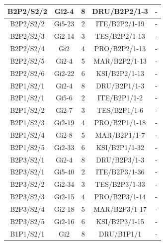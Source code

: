 \documentclass[a4paper,12pt]{extarticle}  %
\begin{document}
\begin{longtable}[c]{|c|c|c|c|c|}
	B2P2/S2/2 & Gi2-4   & 8 & DRU/B2P2/1-3  & -           \\ \hline %
	B2P2/S2/2 & Gi5-23  & 2 & ITE/B2P2/1-19 & -           \\ \hline %
	B2P2/S2/3 & Gi2-14  & 3 & TES/B2P2/1-13 & -           \\ \hline %
	B2P2/S2/4 & Gi2     & 4 & PRO/B2P2/1-13 & -           \\ \hline %
	B2P2/S2/5 & Gi2-4   & 5 & MAR/B2P2/1-13 & -           \\ \hline %
	B2P2/S2/6 & Gi2-22  & 6 & KSI/B2P2/1-13 & -           \\ \hline %
	B2P1/S2/1 & Gi2-4   & 8 & DRU/B2P1/1-3  & -           \\ \hline %
	B2P1/S2/1 & Gi5-6   & 2 & ITE/B2P1/1-2  & -           \\ \hline %
	B2P1/S2/2 & Gi2-7   & 3 & TES/B2P1/1-6  & -           \\ \hline %
	B2P1/S2/3 & Gi2-19  & 4 & PRO/B2P1/1-18 & -           \\ \hline %
	B2P1/S2/4 & Gi2-8   & 5 & MAR/B2P1/1-7  & -           \\ \hline %
	B2P1/S2/5 & Gi2-33  & 6 & KSI/B2P1/1-32 & -           \\ \hline %
	B2P3/S2/1 & Gi2-4   & 8 & DRU/B2P3/1-3  & -           \\ \hline %
	B2P3/S2/1 & Gi5-40  & 2 & ITE/B2P3/1-36 & -           \\ \hline %
	B2P3/S2/2 & Gi2-34  & 3 & TES/B2P3/1-33 & -           \\ \hline %
	B2P3/S2/3 & Gi2-15  & 4 & PRO/B2P3/1-14 & -           \\ \hline %
	B2P3/S2/4 & Gi2-18  & 5 & MAR/B2P3/1-17 & -           \\ \hline %
	B2P3/S2/5 & Gi2-16  & 6 & KSI/B2P3/1-15 & -           \\ \hline %
	B1P1/S2/1 & Gi2     & 8 & DRU/B1P1/1    & -           \\ \hline %

\end{longtable}
\end{document}
